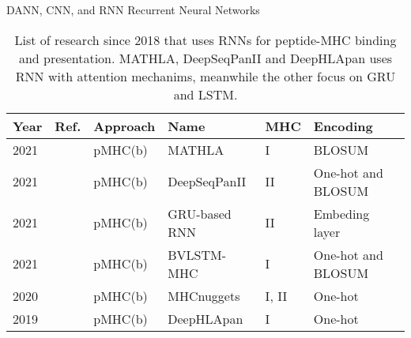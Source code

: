 \documentclass[10pt]{beamer}
\newcommand{\1}{
	\setbeamertemplate{background}{
		\texttt{[image: img/1]}
		\tikz[overlay] \fill[fill opacity=0.75,fill=white] (0,0) rectangle (-\paperwidth,\paperheight);
	}
}
\begin{document}
\begin{frame}{DANN, CNN, and RNN }{Recurrent Neural Networks}
	
	\fontsize{8pt}{5pt}\selectfont
	
	\begin{table}[]
		\centering
		\caption{List of research since 2018 that uses RNNs for peptide-MHC binding and presentation. MATHLA, DeepSeqPanII and DeepHLApan uses RNN with attention mechanims, meanwhile the other focus on GRU and LSTM.}		
		\setlength{\tabcolsep}{0.5em} %
		{\renewcommand{\arraystretch}{2}%
			\begin{tabular}{p{0.6cm}p{0.6cm}p{1.5cm}p{2cm}p{0.6cm}p{2.7cm}}
				\textbf{Year} & \textbf{Ref.}                               & \textbf{Approach}   & \textbf{Name} & \textbf{MHC} & \textbf{Encoding}                                                                                                                                                                                                                         \\ \hline
				2021          & \cite{ye2021mathla}        & pMHC(b) & MATHLA        & I        & BLOSUM                      \\
				
				2021          & \cite{liu2021deepseqpanii} & pMHC(b)                     & DeepSeqPanII                      & II       & One-hot  and BLOSUM                                                    \\
				
				2021          & \cite{heng2021simple}      & pMHC(b)                     & GRU-based RNN                     & II       & Embeding layer                                                        \\
				
				2021          & \cite{jiang2021predicting} & pMHC(b)                     & BVLSTM-MHC                        & I        & One-hot  and BLOSUM                                                                        \\
				
				2020          & \cite{shao2020high}        & pMHC(b)                     & MHCnuggets                        & I, II & One-hot                \\
				
				2019          & \cite{wu2019deephlapan}    & pMHC(b)                     & DeepHLApan                        & I        & One-hot                     
			\end{tabular}
		}
	\end{table}	
\end{frame}
\end{document}
